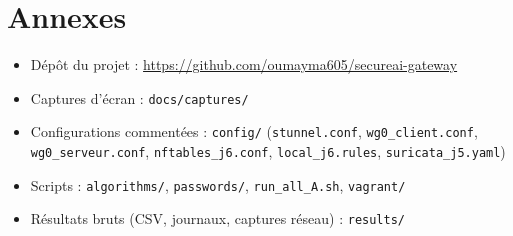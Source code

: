 \documentclass[11pt,a4paper]{article}
\newcommand{\fic}[1]{\texttt{#1}}
\begin{document}
\section*{Annexes}
\begin{itemize}
  \item Dépôt du projet : \url{https://github.com/oumayma605/secureai-gateway}
  \item Captures d'écran : \fic{docs/captures/}
  \item Configurations commentées : \fic{config/} (\fic{stunnel.conf}, \fic{wg0\_client.conf},
        \fic{wg0\_serveur.conf}, \fic{nftables\_j6.conf}, \fic{local\_j6.rules},
        \fic{suricata\_j5.yaml})
  \item Scripts : \fic{algorithms/}, \fic{passwords/}, \fic{run\_all\_A.sh}, \fic{vagrant/}
  \item Résultats bruts (CSV, journaux, captures réseau) : \fic{results/}
\end{itemize}
\end{document}
